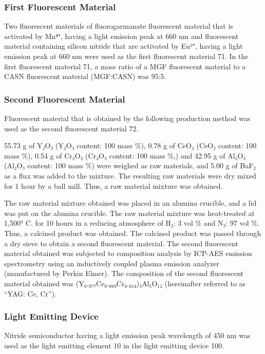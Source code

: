 \documentclass[11pt,a4paper]{article}
\begin{document}
\subsubsection{First Fluorescent Material}

Two fluorescent materials of fluorogarmanate fluorescent material that is activated by Mn⁴⁺, having a light emission peak at 660 nm and fluorescent material containing silicon nitride that are activated by Eu²⁺, having a light emission peak at 660 nm were used as the first fluorescent material 71. In the first fluorescent material 71, a mass ratio of a MGF fluorescent material to a CASN fluorescent material (MGF:CASN) was 95:5.

\subsubsection{Second Fluorescent Material}

Fluorescent material that is obtained by the following production method was used as the second fluorescent material 72.

55.73 g of Y₂O₃ (Y₂O₃ content: 100 mass \%), 0.78 g of CeO₂ (CeO₂ content: 100 mass \%), 0.54 g of Cr₂O₃ (Cr₂O₃ content: 100 mass \%,) and 42.95 g of Al₂O₃ (Al₂O₃ content: 100 mass \%) were weighed as raw materials, and 5.00 g of BaF₂ as a flux was added to the mixture. The resulting raw materials were dry mixed for 1 hour by a ball mill. Thus, a raw material mixture was obtained.

The raw material mixture obtained was placed in an alumina crucible, and a lid was put on the alumina crucible. The raw material mixture was heat-treated at 1,500° C. for 10 hours in a reducing atmosphere of H₂: 3 vol \% and N₂: 97 vol \%. Thus, a calcined product was obtained. The calcined product was passed through a dry sieve to obtain a second fluorescent material. The second fluorescent material obtained was subjected to composition analysis by ICP-AES emission spectrometry using an inductively coupled plasma emission analyzer (manufactured by Perkin Elmer). The composition of the second fluorescent material obtained was (Y₀.₉₇₇Ce₀.₀₀₉Cr₀.₀₁₄)₃Al₅O₁₂ (hereinafter referred to as “YAG: Ce, Cr”).

\subsubsection{Light Emitting Device}

Nitride semiconductor having a light emission peak wavelength of 450 nm was used as the light emitting element 10 in the light emitting device 100.
\end{document}
